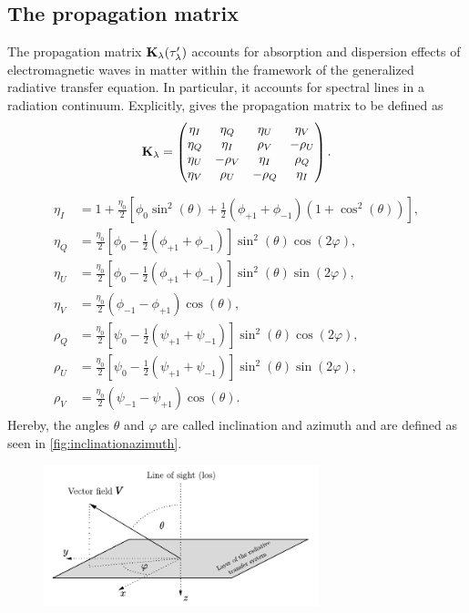 \documentclass[a4paper,11pt]{report}
\def\lk#1{{\color{black}{#1}}}
\begin{document}
\subsection{The propagation matrix}\label{sec:propagationmatrix}
The propagation matrix $\boldsymbol{\mathbf{K}}_\lambda(\tau_\lambda^\prime)$ accounts for absorption and dispersion effects of electromagnetic waves in matter within the framework of the generalized radiative transfer equation. In particular, it accounts for spectral lines in a radiation continuum. Explicitly, \cite[p.154]{Stix.2002} gives the propagation matrix to be defined as \begin{equation}
\boldsymbol{\mathbf{K}}_\lambda = \begin{pmatrix}
\eta_I & \eta_Q & \eta_U & \eta_V \\
\eta_Q & \eta_I & \rho_V & -\rho_U \\
\eta_U & -\rho_V & \eta_I & \rho_Q \\
\eta_V & \rho_U & -\rho_Q & \eta_I
\end{pmatrix}.
\end{equation} \cite[p.116]{delToroIniesta.2003} \lk{gives the individual entries of this matrix as} \begin{align}\begin{aligned}
\eta_I &= 1 + \frac{\eta_0}{2}\left[\phi_0\sin^2(\theta) + \frac{1}{2}(\phi_{+1}+\phi_{-1})(1+\cos^2(\theta))\right], \\
\eta_Q &= \frac{\eta_0}{2}\left[\phi_0-\frac{1}{2}(\phi_{+1}+\phi_{-1})\right]\sin^2(\theta)\cos(2\varphi), \\
\eta_U &= \frac{\eta_0}{2}\left[\phi_0 - \frac{1}{2}(\phi_{+1}+\phi_{-1})\right]\sin^2(\theta)\sin(2\varphi), \\
\eta_V &= \frac{\eta_0}{2}(\phi_{-1}-\phi_{+1})\cos(\theta), \\
\rho_Q &= \frac{\eta_0}{2}\left[\psi_0-\frac{1}{2}(\psi_{+1}+\psi_{-1})\right]\sin^2(\theta)\cos(2\varphi), \\
\rho_U &= \frac{\eta_0}{2}\left[\psi_0-\frac{1}{2}(\psi_{+1}+\psi_{-1})\right]\sin^2(\theta)\sin(2\varphi), \\
\rho_V &= \frac{\eta_0}{2}(\psi_{-1}-\psi_{+1})\cos(\theta).
\end{aligned}
\end{align} Hereby, the angles $\theta$ and $\varphi$ are called inclination and azimuth and are defined as seen in \cref{fig:inclinationazimuth}. \begin{figure}[h]
\centering
\includegraphics[width=8cm]{figures/inclinationazimuth.pdf}

\end{figure}
\end{document}
